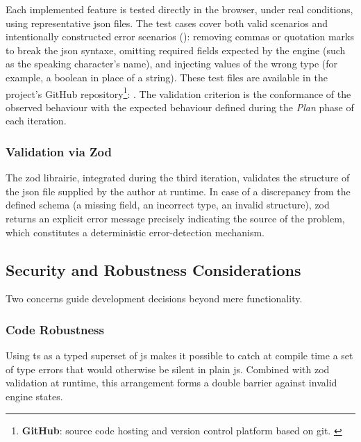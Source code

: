 Each implemented feature is tested directly in the browser, under real conditions, using representative \gls{json} files. The test cases cover both valid scenarios and intentionally constructed error scenarios (): removing commas or quotation marks to break the \gls{json} \gls{syntaxe}, omitting required fields expected by the engine (such as the speaking character's name), and injecting values of the wrong type (for example, a boolean in place of a string). These test files are available in the project's GitHub repository\footnote{\textbf{GitHub}: source code hosting and version control platform based on \gls{git}. \parencite{noauthor_build_nodate}}: \nsrepo. The validation criterion is the conformance of the observed behaviour with the expected behaviour defined during the \textit{Plan} phase of each iteration.


\subsubsection{Validation via Zod} \label{sec:zod}

The \gls{zod} \gls{librairie}, integrated during the third iteration, validates the structure of the \gls{json} file supplied by the author at runtime. In case of a discrepancy from the defined \gls{schema} (a missing field, an incorrect type, an invalid structure), \gls{zod} returns an explicit error message precisely indicating the source of the problem, which constitutes a deterministic error-detection mechanism.

\clearpage


\subsection{Security and Robustness Considerations}

Two concerns guide development decisions beyond mere functionality.


\subsubsection{Code Robustness}

Using \gls{ts} as a typed superset of \gls{js} makes it possible to catch at compile time a set of type errors that would otherwise be silent in plain \gls{js}. Combined with \gls{zod} validation at runtime, this arrangement forms a double barrier against invalid engine states. \parencite{noauthor_starting_nodate}


